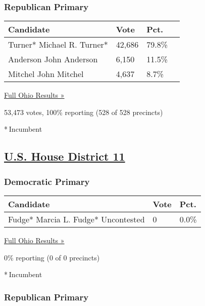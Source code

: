 \hypertarget{republican-primary-11}{%
\subsubsection{Republican Primary}\label{republican-primary-11}}

\begin{longtable}[]{@{}llll@{}}
\toprule
Candidate & Vote & Pct. &\tabularnewline
\midrule
\endhead
 Turner* Michael R. Turner* & 42,686 & 79.8\% &\tabularnewline
 Anderson John Anderson & 6,150 & 11.5\% &\tabularnewline
 Mitchel John Mitchel & 4,637 & 8.7\% &\tabularnewline
\bottomrule
\end{longtable}

\href{https://www.nytimes3xbfgragh.onion/elections/results/ohio}{Full
Ohio Results »}

53,473 votes, 100\% reporting (528 of 528 precincts)

* Incumbent

\hypertarget{us-house-district-11}{%
\subsection{\texorpdfstring{\href{https://www.nytimes3xbfgragh.onion/elections/results/ohio-house-district-11-primary-election}{U.S.
House District
11}}{U.S. House District 11}}\label{us-house-district-11}}

\hypertarget{democratic-primary-12}{%
\subsubsection{Democratic Primary}\label{democratic-primary-12}}

\begin{longtable}[]{@{}lll@{}}
\toprule
Candidate & Vote & Pct.\tabularnewline
\midrule
\endhead
 Fudge﻿* Marcia L. Fudge﻿* Uncontested & 0 & 0.0\%\tabularnewline
\bottomrule
\end{longtable}

\href{https://www.nytimes3xbfgragh.onion/elections/results/ohio}{Full
Ohio Results »}

0\% reporting (0 of 0 precincts)

* Incumbent

\hypertarget{republican-primary-12}{%
\subsubsection{Republican Primary}\label{republican-primary-12}}

